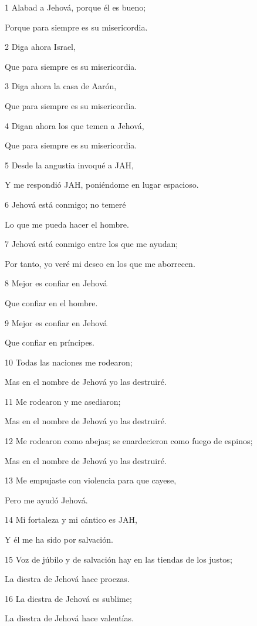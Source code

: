 \par 1 Alabad a Jehová, porque él es bueno;
\par Porque para siempre es su misericordia.
\par 2 Diga ahora Israel,
\par Que para siempre es su misericordia.
\par 3 Diga ahora la casa de Aarón,
\par Que para siempre es su misericordia.
\par 4 Digan ahora los que temen a Jehová,
\par Que para siempre es su misericordia.
\par 5 Desde la angustia invoqué a JAH,
\par Y me respondió JAH, poniéndome en lugar espacioso.
\par 6 Jehová está conmigo; no temeré
\par Lo que me pueda hacer el hombre.
\par 7 Jehová está conmigo entre los que me ayudan;
\par Por tanto, yo veré mi deseo en los que me aborrecen.
\par 8 Mejor es confiar en Jehová
\par Que confiar en el hombre.
\par 9 Mejor es confiar en Jehová
\par Que confiar en príncipes.
\par 10 Todas las naciones me rodearon;
\par Mas en el nombre de Jehová yo las destruiré.
\par 11 Me rodearon y me asediaron;
\par Mas en el nombre de Jehová yo las destruiré.
\par 12 Me rodearon como abejas; se enardecieron como fuego de espinos;
\par Mas en el nombre de Jehová yo las destruiré.
\par 13 Me empujaste con violencia para que cayese,
\par Pero me ayudó Jehová.
\par 14 Mi fortaleza y mi cántico es JAH,
\par Y él me ha sido por salvación.
\par 15 Voz de júbilo y de salvación hay en las tiendas de los justos;
\par La diestra de Jehová hace proezas.
\par 16 La diestra de Jehová es sublime;
\par La diestra de Jehová hace valentías.
